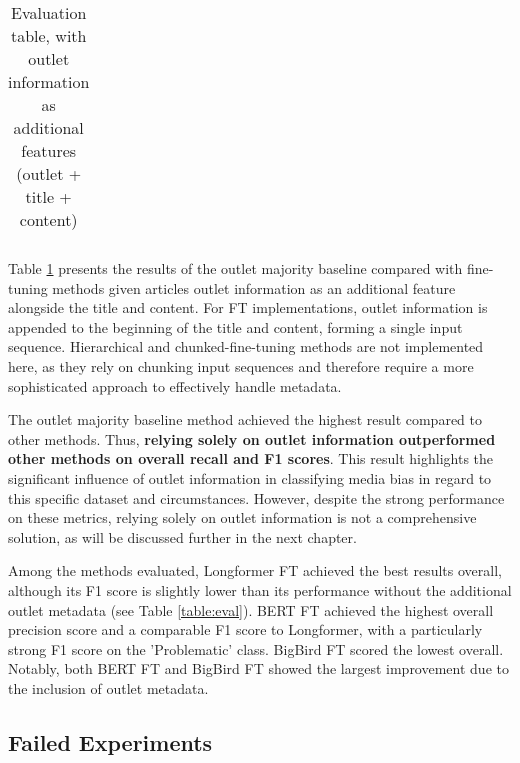 \begin{table}[htbp]
\begin{tabular}{| c | l | r | r | r |}
    \end{tabular}
    \caption{Evaluation table, with outlet information as additional features (outlet + title + content)}
    \label{table:eval-outlet}
\end{table}

Table \ref{table:eval-outlet} presents the results of the outlet majority baseline compared with fine-tuning methods given articles outlet information as an additional feature alongside the title and content. For FT implementations, outlet information is appended to the beginning of the title and content, forming a single input sequence. Hierarchical and chunked-fine-tuning methods are not implemented here, as they rely on chunking input sequences and therefore require a more sophisticated approach to effectively handle metadata.

The outlet majority baseline method achieved the highest result compared to other methods. Thus, \textbf{relying solely on outlet information outperformed other methods on overall recall and F1 scores}. This result highlights the significant influence of outlet information in classifying media bias in regard to this specific dataset and circumstances. However, despite the strong performance on these metrics, relying solely on outlet information is not a comprehensive solution, as will be discussed further in the next chapter.

Among the methods evaluated, Longformer FT achieved the best results overall, although its F1 score is slightly lower than its performance without the additional outlet metadata (see Table \ref{table:eval}). BERT FT achieved the highest overall precision score and a comparable F1 score to Longformer, with a particularly strong F1 score on the 'Problematic' class. BigBird FT scored the lowest overall. Notably, both BERT FT and BigBird FT showed the largest improvement due to the inclusion of outlet metadata.

\subsection{Failed Experiments}

